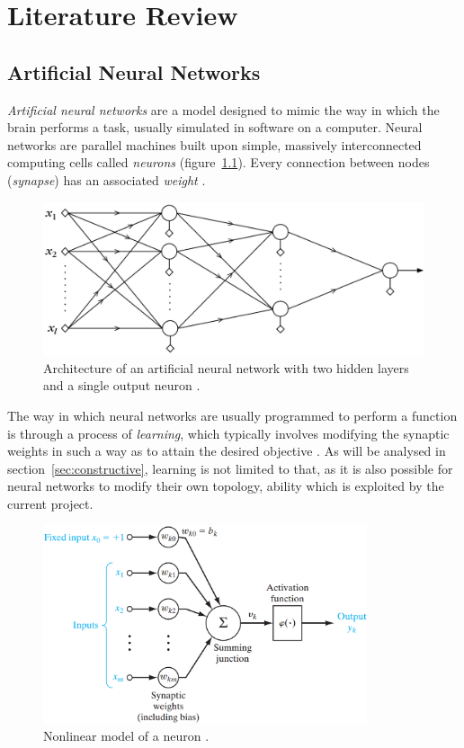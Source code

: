 \documentclass[11pt,a4paper]{report}
\begin{document}
	
	\chapter{Literature Review}
		\section{Artificial Neural Networks}
			\emph{Artificial neural networks} are a model designed to mimic the way in which the brain performs a task, usually simulated in software on a computer. Neural networks are parallel machines built upon simple, massively interconnected computing cells called \emph{neurons} (figure~\ref{fig:multilayer}). Every connection between nodes (\emph{synapse}) has an associated \emph{weight} \cite{haykin2009neural}.
		
			\begin{figure}[h]
				\centering
				\includegraphics[width=\textwidth]{multilayer}
				\caption[Network with two hidden layers and single output neuron.]{Architecture of an artificial neural network with two hidden layers and a single output neuron \cite{theodoridis2008pattern}.}
				\label{fig:multilayer}
			\end{figure}		
		
			The way in which neural networks are usually programmed to perform a function is through a process of \emph{learning}, which typically involves modifying the synaptic weights in such a way as to attain the desired objective \cite{haykin2009neural}. As will be analysed in section~\ref{sec:constructive}, learning is not limited to that, as it is also possible for neural networks to modify their own topology, ability which is exploited by the current project.
		
			\newpage
		
			\begin{figure}[t]
				\centering
				\includegraphics[width=0.85\textwidth]{neuron}
				\caption{Nonlinear model of a neuron \cite{haykin2009neural}.}
				\label{fig:neuron}
			\end{figure}
		
\end{document}
